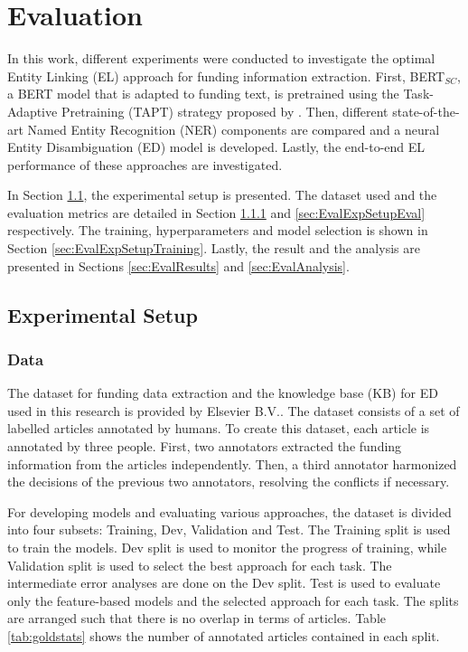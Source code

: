 \documentclass{report}
\theoremstyle{definition}
\theoremstyle{remark}
\begin{document}
\newpage
\chapter{Evaluation}
\label{sec:Evaluation}
In this work, different experiments were conducted to investigate the optimal Entity Linking (EL) approach for funding information extraction. First, BERT$_{SC}$, a BERT model that is adapted to funding text, is pretrained using the Task-Adaptive Pretraining (TAPT) strategy proposed by \cite{DontStop}. Then, different state-of-the-art Named Entity Recognition (NER) components are compared and a neural Entity Disambiguation (ED) model is developed. Lastly, the end-to-end EL performance of these approaches are investigated.

In Section \ref{sec:EvalExpSetup}, the experimental setup is presented. The dataset used and the evaluation metrics are detailed in Section \ref{sec:EvalExpSetupData} and \ref{sec:EvalExpSetupEval} respectively. The training, hyperparameters and model selection is shown in Section \ref{sec:EvalExpSetupTraining}. Lastly, the result and the analysis are presented in Sections \ref{sec:EvalResults} and \ref{sec:EvalAnalysis}.

\section{Experimental Setup}
\label{sec:EvalExpSetup}

\subsection{Data}
\label{sec:EvalExpSetupData}

The dataset for funding data extraction and the knowledge base (KB) for ED used in this research is provided by Elsevier B.V.. The dataset consists of a set of labelled articles annotated by humans. To create this dataset, each article is annotated by three people. First, two annotators extracted the funding information from the articles independently. Then, a third annotator harmonized the decisions of the previous two annotators, resolving the conflicts if necessary. 

For developing models and evaluating various approaches, the dataset is divided into four subsets: Training, Dev, Validation and Test. The Training split is used to train the models. Dev split is used to monitor the progress of training, while Validation split is used to select the best approach for each task. The intermediate error analyses are done on the Dev split. Test is used to evaluate only the feature-based models and the selected approach for each task. The splits are arranged such that there is no overlap in terms of articles. Table \ref{tab:goldstats} shows the number of annotated articles contained in each split.
\end{document}
